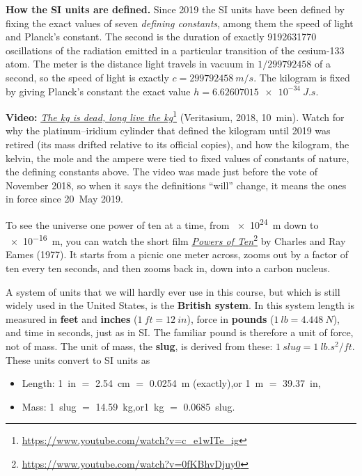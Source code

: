 \documentclass[11pt,a4paper]{article}
\begin{document}
\begin{aside}
\textbf{How the SI units are defined.} Since 2019 the SI units have been defined by fixing the
exact values of seven \emph{defining constants}, among them the speed of light and Planck's
constant. The second is the duration of exactly
\num{9192631770} oscillations of the radiation emitted in a particular transition of the
cesium-133 atom. The meter is the distance light travels in vacuum in $1/\num{299792458}$ of a
second, so the speed of light is exactly $c = \qty{299792458}{m/s}$. The kilogram is fixed by
giving Planck's constant the exact value $h = \qty{6.62607015e-34}{J.s}$.

\smallskip
\textbf{Video:}
\href{https://www.youtube.com/watch?v=c_e1wITe_ig}{\emph{The kg is dead, long live the
kg}}\footnote{\url{https://www.youtube.com/watch?v=c_e1wITe_ig}} (Veritasium, 2018, 10~min).
Watch for why the platinum--iridium cylinder that defined the kilogram until 2019 was retired (its
mass drifted relative to its official copies), and how the kilogram, the kelvin, the mole and the
ampere were tied to fixed values of constants of nature, the defining constants above. The video
was made just before the vote of November 2018, so when it says the definitions ``will'' change,
it means the ones in force since 20~May 2019.
\end{aside}

To see the universe one power of ten at a time, from \qty{e24}{m} down to \qty{e-16}{m}, you can
watch the short film \href{https://www.youtube.com/watch?v=0fKBhvDjuy0}{\emph{Powers of
Ten}}\footnote{\url{https://www.youtube.com/watch?v=0fKBhvDjuy0}} by Charles and Ray Eames
(1977). It starts from a picnic one meter across, zooms out by a factor of ten every ten seconds,
and then zooms back in, down into a carbon nucleus.

A system of units that we will hardly ever use in this course, but which is still widely used in
the United States, is the \textbf{British system}. In this system length is measured in
\textbf{feet} and \textbf{inches} ($\qty{1}{ft} = \qty{12}{in}$), force in \textbf{pounds}
($\qty{1}{lb} = \qty{4.448}{N}$), and time in seconds, just as in SI. The familiar pound is
therefore a unit of force, not of mass. The unit of mass, the \textbf{slug}, is derived from
these: $\qty{1}{slug} = \qty{1}{lb.s^2/ft}$. These units convert to SI units as
\begin{itemize}
  \item Length: \qty{1}{in} $=$ \qty{2.54}{cm} $=$ \qty{0.0254}{m} (exactly),\quad or\quad
    \qty{1}{m} $=$ \qty{39.37}{in},
  \item Mass: \qty{1}{slug} $=$ \qty{14.59}{kg},\quad or\quad \qty{1}{kg} $=$ \qty{0.0685}{slug}.
\end{itemize}
\end{document}
